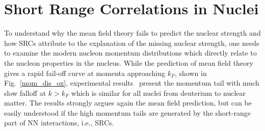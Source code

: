 \section{Short Range Correlations in Nuclei}
To understand why the mean field theory fails to predict the nuclear strength and how SRCs attribute to the explanation of the missing nuclear strength, one needs to examine the modern nucleon momentum distributions which directly relate to the nucleon properties in the nucleus. While the prediction of mean field theory gives a rapid fail-off curve at momenta approaching $k_{F}$, shown in Fig.~\ref{mom_dis_ox}, experimental results~\cite{PhysRevC.53.1689} present the momentum tail with much slow falloff at $k>k_{F}$ which is similar for all nuclei from deuterium to nuclear matter. The results strongly argues again the mean field prediction, but can be easily understood if the high momentum tails are generated by the short-range part of NN interactions, i.e., SRCs.

